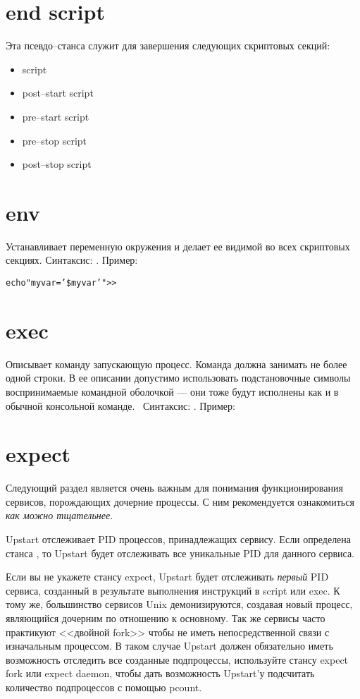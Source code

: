 \section{end script}

Эта псевдо--станса служит для завершения следующих скриптовых секций: \begin{itemize}
\item script
\item post--start script
\item pre--start script
\item pre--stop script
\item post--stop script
\end{itemize}
\section{env}
Устанавливает переменную окружения и делает ее видимой во всех скриптовых секциях. Синтаксис: . Пример: \begin{alltt}
echo "myvar='\$myvar'" >> 
\end{alltt}
\section{exec}
Описывает команду запускающую процесс. Команда должна занимать не более одной строки. В ее описании допустимо использовать подстановочные символы воспринимаемые командной оболочкой --- они тоже будут исполнены как и в обычной консольной команде. ~Синтаксис: . Пример: \begin{alltt}
\end{alltt}
\section{expect}
Следующий раздел является очень важным для понимания функционирования сервисов, порождающих дочерние процессы. С ним рекомендуется ознакомиться \textit{как можно тщательнее}.

Upstart отслеживает PID процессов, принадлежащих сервису. Если определена станса , то Upstart будет отслеживать все уникальные PID для данного сервиса.

Если вы не укажете стансу expect, Upstart будет отслеживать \textit{первый} PID сервиса, созданный в результате выполнения инструкций в script или exec. К тому же, большинство сервисов Unix демонизируются, создавая новый процесс, являющийся дочерним по отношению к основному. Так же сервисы часто практикуют <<двойной fork>> чтобы не иметь непосредственной связи с изначальным процессом. В таком случае Upstart должен обязательно иметь возможность отследить все созданные подпроцессы, используйте стансу expect fork или expect daemon, чтобы дать возможность Upstart'у подсчитать количество подпроцессов с помощью pcount.

